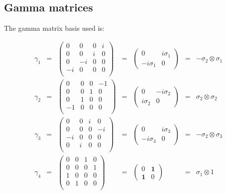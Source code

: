 \documentclass{article}
\begin{document}
\subsection{Gamma matrices}

The gamma matrix basis used is:

\[
\begin{array}{ccccccc}
\gamma_1
 &=& \left(\begin{array}{rrrr}
   0&0&0&i\\
   0&0&i&0\\
   0&-i&0&0\\
   -i&0&0&0\\
 \end{array}\right)
 &=& \left(\begin{array}{rr}
   0&i\sigma_1\\
   -i\sigma_1&0
 \end{array}\right)
 &=& -\sigma_2\!\otimes\!\sigma_1\\
\gamma_2
 &=& \left(\begin{array}{rrrr}
   0&0&0&-1\\
   0&0&1&0\\
   0&1&0&0\\
   -1&0&0&0\\
 \end{array}\right)
 &=& \left(\begin{array}{rr}
   0&-i\sigma_2\\
   i\sigma_2&0
 \end{array}\right)
 &=& \sigma_2\!\otimes\!\sigma_2\\
\gamma_3
 &=& \left(\begin{array}{rrrr}
   0&0&i&0\\
   0&0&0&-i\\
   -i&0&0&0\\
   0&i&0&0\\
 \end{array}\right)
 &=& \left(\begin{array}{rr}
   0&i\sigma_3\\
   -i\sigma_3&0
 \end{array}\right)
 &=& -\sigma_2\!\otimes\!\sigma_3\\
\gamma_4
 &=& \left(\begin{array}{rrrr}
   0&0&1&0\\
   0&0&0&1\\
   1&0&0&0\\
   0&1&0&0\\
 \end{array}\right)
 &=& \left(\begin{array}{rr}
   0&\mathbf{1}\\
   \mathbf{1}&0
 \end{array}\right)
 &=& \sigma_1\!\otimes\!1\\
\end{array}
\]
\end{document}
